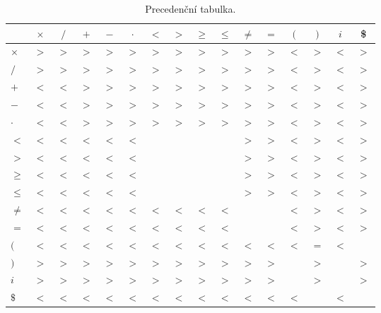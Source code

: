 \documentclass[a4paper, 12pt]{article}
\begin{document}
    \begin{table}[H]
        \centering
        \begin{tabular}[p]{| l | c | c | c | c | c | c | c | c | c | c | c | c | c | c | c |}
            \hline
            &   \textbf{$\times$} & \textbf{$/$} & \textbf{$+$} & \textbf{$-$} & \textbf{$\cdot$} & \textbf{$<$} & \textbf{$>$} & \textbf{{$\geq$}} & \textbf{$\leq$} & \textbf{$\neq$} & \textbf{$=$} & \textbf{$($} & \textbf{$)$} & \textbf{$i$} & \textbf{\$} \\
            \hline
            \textbf{$\times$} &
                $>$ & $>$ & $>$ & $>$ & $>$ & $>$ & $>$ & $>$ & $>$ & $>$ & $>$ & $<$ & $>$ & $<$ & $>$ \\
            \textbf{$/$} &
                $>$ & $>$ & $>$ & $>$ & $>$ & $>$ & $>$ & $>$ & $>$ & $>$ & $>$ & $<$ & $>$ & $<$ & $>$ \\
            \textbf{$+$} &
                $<$ & $<$ & $>$ & $>$ & $>$ & $>$ & $>$ & $>$ & $>$ & $>$ & $>$ & $<$ & $>$ & $<$ & $>$ \\
            \textbf{$-$} &
                $<$ & $<$ & $>$ & $>$ & $>$ & $>$ & $>$ & $>$ & $>$ & $>$ & $>$ & $<$ & $>$ & $<$ & $>$ \\
            \textbf{$\cdot$} &
                $<$ & $<$ & $>$ & $>$ & $>$ & $>$ & $>$ & $>$ & $>$ & $>$ & $>$ & $<$ & $>$ & $<$ & $>$ \\
            \textbf{$<$} &
                $<$ & $<$ & $<$ & $<$ & $<$ &     &     &     &     & $>$ & $>$ & $<$ & $>$ & $<$ & $>$ \\
            \textbf{$>$} &
                $<$ & $<$ & $<$ & $<$ & $<$ &     &     &     &     & $>$ & $>$ & $<$ & $>$ & $<$ & $>$ \\
            \textbf{$\geq$} &
                $<$ & $<$ & $<$ & $<$ & $<$ &     &     &     &     & $>$ & $>$ & $<$ & $>$ & $<$ & $>$ \\
            \textbf{$\leq$} &
                $<$ & $<$ & $<$ & $<$ & $<$ &     &     &     &     & $>$ & $>$ & $<$ & $>$ & $<$ & $>$ \\
            \textbf{$\neq$} &
                $<$ & $<$ & $<$ & $<$ & $<$ & $<$ & $<$ & $<$ & $<$ &     &     & $<$ & $>$ & $<$ & $>$ \\
            \textbf{$=$} &
                $<$ & $<$ & $<$ & $<$ & $<$ & $<$ & $<$ & $<$ & $<$ &     &     & $<$ & $>$ & $<$ & $>$ \\
            \textbf{$($} &
                $<$ & $<$ & $<$ & $<$ & $<$ & $<$ & $<$ & $<$ & $<$ & $<$ & $<$ & $<$ & $=$ & $<$ &     \\
            \textbf{$)$} &
                $>$ & $>$ & $>$ & $>$ & $>$ & $>$ & $>$ & $>$ & $>$ & $>$ & $>$ &     & $>$ &     & $>$ \\
            \textbf{$i$} &
                $>$ & $>$ & $>$ & $>$ & $>$ & $>$ & $>$ & $>$ & $>$ & $>$ & $>$ &     & $>$ &     & $>$ \\
            \textbf{$\$$} &
                $<$ & $<$ & $<$ & $<$ & $<$ & $<$ & $<$ & $<$ & $<$ & $<$ & $<$ & $<$ &     & $<$ &     \\
            \hline
        \end{tabular}
        \caption{Precedenční tabulka.}
        \label{tabulka precedence}
    \end{table}
\end{document}
